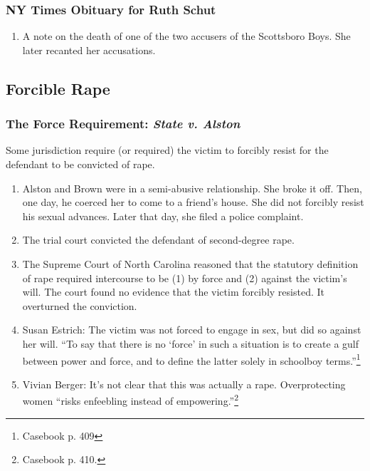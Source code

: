 \subsubsection{NY Times Obituary for Ruth Schut}

\begin{enumerate}
    \item A note on the death of one of the two accusers of the Scottsboro 
    Boys. She later recanted her accusations.
\end{enumerate}

\subsection{Forcible Rape}

\subsubsection{The Force Requirement: \emph{State v. Alston}}

Some jurisdiction require (or required) the victim to forcibly resist for the 
defendant to be convicted of rape.

\begin{enumerate}
    \item Alston and Brown were in a semi-abusive relationship. She broke it 
    off. Then, one day, he coerced her to come to a friend's house. She did 
    not forcibly resist his sexual advances. Later that day, she filed a 
    police complaint.
    \item The trial court convicted the defendant of second-degree rape.
    \item The Supreme Court of North Carolina reasoned that the statutory 
    definition of rape required intercourse to be (1) by force and (2) against 
    the victim's will. The court found no evidence that the victim forcibly 
    resisted. It overturned the conviction.
    \item Susan Estrich: The victim was not forced to engage in sex, but did 
    so against her will. ``To say that there is no `force' in such a situation 
    is to create a gulf between power and force, and to define the latter 
    solely in schoolboy terms.''\footnote{Casebook p. 409}
    \item Vivian Berger: It's not clear that this was actually a rape. 
    Overprotecting women ``risks enfeebling instead of 
    empowering.''\footnote{Casebook p. 410.}
\end{enumerate}

